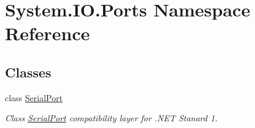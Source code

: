 \hypertarget{namespace_system_1_1_i_o_1_1_ports}{}\section{System.\+I\+O.\+Ports Namespace Reference}
\label{namespace_system_1_1_i_o_1_1_ports}
\subsection*{Classes}
\begin{DoxyCompactItemize}
\item 
class \mbox{\hyperlink{class_system_1_1_i_o_1_1_ports_1_1_serial_port}{Serial\+Port}}
\begin{DoxyCompactList}\small\item\em Class \mbox{\hyperlink{class_system_1_1_i_o_1_1_ports_1_1_serial_port}{Serial\+Port}} compatibility layer for .N\+ET Stanard 1. \end{DoxyCompactList}\end{DoxyCompactItemize}
